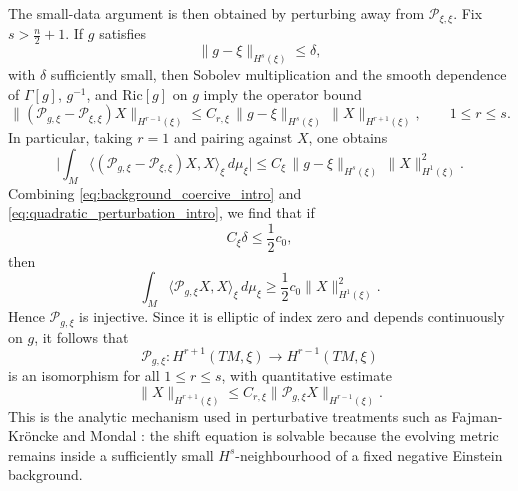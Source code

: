 \documentclass{amsart}
\begin{document}
\noindent The small-data argument is then obtained by perturbing away from
\(\mathcal P_{\xi,\xi}\).  Fix \(s>\frac n2+1\).  If \(g\) satisfies
\begin{equation}
\label{eq:g_close_xi_intro}
\|g-\xi\|_{H^{s}(\xi)}\le \delta,
\end{equation}
with \(\delta\) sufficiently small, then Sobolev multiplication and the smooth dependence of
\(\Gamma[g]\), \(g^{-1}\), and \(\text{Ric}[g]\) on \(g\) imply the operator bound
\begin{equation}
\label{eq:operator_perturbation_intro}
\|(\mathcal P_{g,\xi}-\mathcal P_{\xi,\xi})X\|_{H^{r-1}(\xi)}
\le
C_{r,\xi}\,\|g-\xi\|_{H^{s}(\xi)}\,\|X\|_{H^{r+1}(\xi)},
\qquad 1\le r\le s.
\end{equation}
In particular, taking \(r=1\) and pairing against \(X\), one obtains
\begin{equation}
\label{eq:quadratic_perturbation_intro}
\biggl|
\int_{M}
\bigl\langle
(\mathcal P_{g,\xi}-\mathcal P_{\xi,\xi})X,X
\bigr\rangle_{\xi}\,d\mu_{\xi}
\biggr|
\le
C_{\xi}\,\|g-\xi\|_{H^{s}(\xi)}\,\|X\|_{H^{1}(\xi)}^{2}.
\end{equation}
Combining \eqref{eq:background_coercive_intro} and
\eqref{eq:quadratic_perturbation_intro}, we find that if
\[
C_{\xi}\delta\le \frac12 c_{0},
\]
then
\begin{equation}
\label{eq:P_g_xi_coercive_intro}
\int_{M}\langle \mathcal P_{g,\xi}X,X\rangle_{\xi}\,d\mu_{\xi}
\ge \frac12 c_{0}\|X\|_{H^{1}(\xi)}^{2}.
\end{equation}
Hence \(\mathcal P_{g,\xi}\) is injective. Since it is elliptic of index zero and depends
continuously on \(g\), it follows that
\[
\mathcal P_{g,\xi}\colon H^{r+1}(TM,\xi)\to H^{r-1}(TM,\xi)
\]
is an isomorphism for all \(1\le r\le s\), with quantitative estimate
\begin{equation}
\label{eq:shift_estimate_intro}
\|X\|_{H^{r+1}(\xi)}
\le
C_{r,\xi}\|\mathcal P_{g,\xi}X\|_{H^{r-1}(\xi)}.
\end{equation}
This is the analytic mechanism used in perturbative treatments such as
Fajman-Kr\"oncke \cite{fajman2020stable} and Mondal \cite{mondal2019attractors}: the shift equation is solvable because the evolving metric
remains inside a sufficiently small \(H^{s}\)-neighbourhood of a fixed negative Einstein
background.
\end{document}
